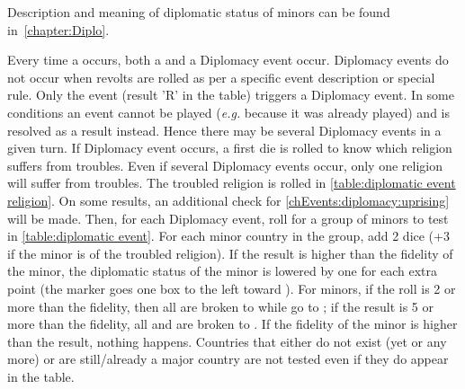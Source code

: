 \begin{designnote}
  Description and meaning of diplomatic status of minors can be found
  in~\ref{chapter:Diplo}.
\end{designnote}

\aparag Every time a \RD occurs, both a \REVOLT and a Diplomacy event
occur.
\bparag Diplomacy events do not occur when revolts are rolled as per a
specific event description or special rule. Only the \RD event (result
'R' in the table) triggers a Diplomacy event.
\bparag In some conditions an event cannot be played (\emph{e.g.}
because it was already played) and is resolved as a \RD result
instead. Hence there may be several Diplomacy events in a given turn.
\aparag If Diplomacy event occurs, a first die is rolled to know which
religion suffers from troubles.
\bparag Even if several Diplomacy events occur, only one religion will
suffer from troubles.
\bparag The troubled religion is rolled in \ref{table:diplomatic event
  religion}.
\bparag On some results, an additional check for
\ref{chEvents:diplomacy:uprising} will be made.
\aparag Then, for each Diplomacy event, roll for a group of minors to
test in \ref{table:diplomatic event}.
\bparag For each minor country in the group, add 2 dice (+3 if the minor
is of the troubled religion).
\bparag If the result is higher than the fidelity of the minor, the
diplomatic status of the minor is lowered by one for each extra point
(the marker goes one box to the left toward \Neutral).
\bparag For \ROTW minors, if the roll is 2 or more than the fidelity,
then all \dipFR are broken to \dipNR while \dipAT go to \dipFR ; if the
result is 5 or more than the fidelity, all \dipAT and \dipFR are broken
to \dipNR.
\bparag If the fidelity of the minor is higher than the result, nothing
happens.
\bparag Countries that either do not exist (yet or any more) or are
still/already a major country are not tested even if they do appear in
the table.

